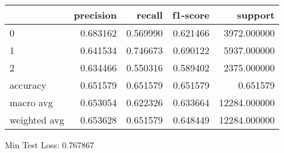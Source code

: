 \begin{tabular}{lrrrr}
\toprule
{} &  precision &    recall &  f1-score &       support \\
\midrule
0            &   0.683162 &  0.569990 &  0.621466 &   3972.000000 \\
1            &   0.641534 &  0.746673 &  0.690122 &   5937.000000 \\
2            &   0.634466 &  0.550316 &  0.589402 &   2375.000000 \\
accuracy     &   0.651579 &  0.651579 &  0.651579 &      0.651579 \\
macro avg    &   0.653054 &  0.622326 &  0.633664 &  12284.000000 \\
weighted avg &   0.653628 &  0.651579 &  0.648449 &  12284.000000 \\
\bottomrule
\end{tabular}

Min Test Loss: 0.767867